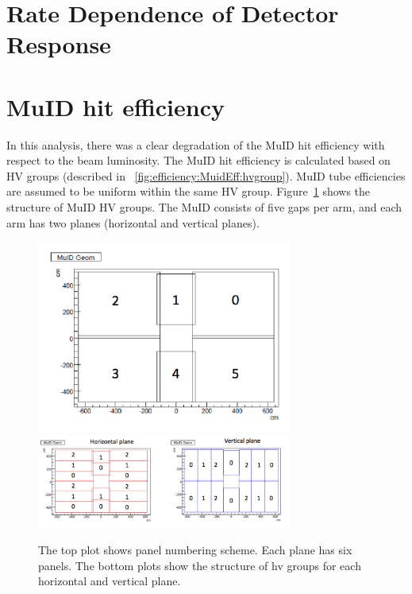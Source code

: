 \section{Rate Dependence of Detector Response}

\section{MuID hit efficiency}
In this analysis, there was a clear degradation of the MuID hit efficiency with
respect to the beam luminosity. The MuID hit efficiency is calculated based on
HV groups (described in ~\ref{fig:efficiency:MuidEff:hvgroup}). MuID tube
efficiencies are assumed to be uniform within the same HV group.
Figure~\ref{Fig:efficiency:MuidEff:hvgroup} shows the structure of MuID HV
groups. The MuID consists of five gaps per arm, and each arm has two planes
(horizontal and vertical planes).

\begin{figure}[ht]
  \centering
  \includegraphics[width=0.75\textwidth]{./figures/muid_panel_structure.pdf}
  \includegraphics[width=0.75\textwidth]{./figures/muid_hv_group.pdf}
  \caption{
    The top plot shows panel numbering scheme. Each plane has six panels. The
    bottom plots show the structure of hv groups for each horizontal and
    vertical plane.
  }
  \label{Fig:efficiency:MuidEff:hvgroup}
\end{figure}

